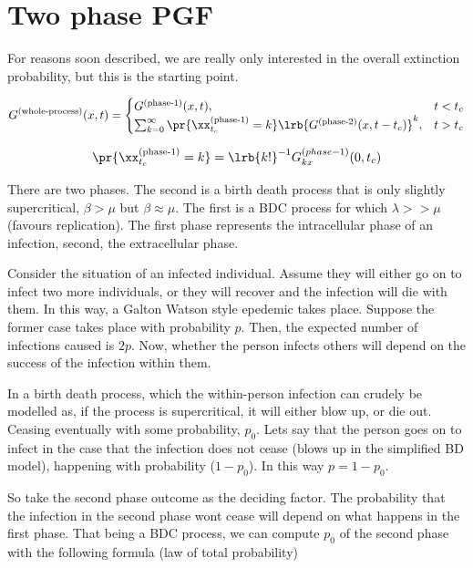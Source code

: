 \section{Two phase PGF}

For reasons soon described, we are really only interested in the overall extinction probability, but this is the starting point. 


$$G^{(\text{whole-process})}(x,t)    = \begin{cases}
G^{(\text{phase-1})}(x,t), & t< t_c\\
\sum_{k=0}^\infty   \pr{\xx_{t_c}^{(\text{phase-1})} = k} \lrb{G^{(\text{phase-2})}(x,t-t_c)}^k, & t>t_c
\end{cases} 
$$


$$ \pr{\xx_{t_c}^{(\text{phase-1})} = k}   =  \lrb{k!}^{-1}  G^{(phase-1)}_{kx}(0, t_c)$$




There are two phases. The second is a birth death process that is only slightly supercritical, $\beta > \mu$ but $\beta \approx \mu$. The first is a BDC process for which $\lambda >> \mu$ (favours replication). The first phase represents the intracellular phase of an infection, second, the extracellular phase.\par

Consider the situation of an infected individual. Assume they will either go on to infect two more individuals, or they will recover and the infection will die with them. In this way, a Galton Watson style epedemic takes place. Suppose the former case takes place with probability $p$. Then, the expected number of infections caused is $2p$. Now, whether the person infects others will depend on the success of the infection within them.\par

In a birth death process, which the within-person infection can crudely be modelled as, if the process is supercritical, it will either blow up, or die out. Ceasing eventually with some probability, $p_0$. Lets say that the person goes on to infect in the case that the infection does not cease (blows up in the simplified BD model), happening with probability ($1-p_0$). In this way $p = 1-p_0$.\par

So take the second phase outcome as the deciding factor. The probability that the infection in the second phase wont cease will depend on what happens in the first phase. That being a BDC process, we can compute $p_0$ of the second phase with the following formula (law of total probability)

